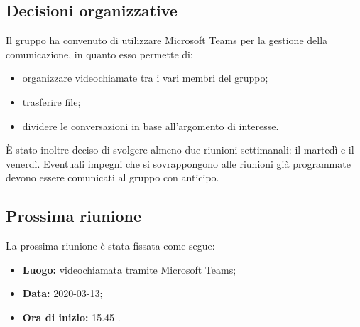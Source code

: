 \subsection{Decisioni organizzative}
Il gruppo ha convenuto di utilizzare Microsoft Teams per la gestione della comunicazione, in quanto esso permette di: 
\begin{itemize}
	\item organizzare videochiamate tra i vari membri del gruppo; 
	\item trasferire file; 
	\item dividere le conversazioni in base all'argomento di interesse.  
\end{itemize}
È stato inoltre deciso di svolgere almeno due riunioni settimanali: il martedì e il venerdì. Eventuali impegni che si sovrappongono alle riunioni già programmate devono essere comunicati al gruppo con anticipo. 

\subsection{Prossima riunione}
La prossima riunione è stata fissata come segue: 
\begin{itemize}
	\item \textbf{Luogo: } videochiamata tramite Microsoft Teams; 
	\item \textbf{Data: } 2020-03-13; 
	\item \textbf{Ora di inizio: } 15.45 .
\end{itemize}